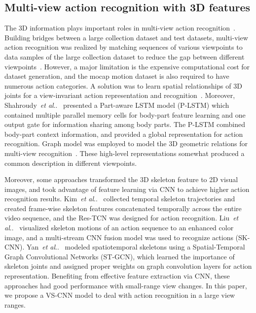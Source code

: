 \documentclass[journal]{IEEEtran}
\makeatletter
\DeclareRobustCommand\onedot{\futurelet\@let@token\@onedot}
\def\@onedot{\ifx\@let@token.\else.\null\fi\xspace}
\def\etal{\emph{et al}\onedot}
\makeatother
\begin{document}
\subsection{Multi-view action recognition with 3D features}
The 3D information plays important roles in multi-view action recognition~\cite{InteractionJi2015,HOI2016}. Building bridges between a large collection dataset and test datasets, multi-view action recognition was realized by matching sequences of various viewpoints to data samples of the large collection dataset to reduce the gap between different viewpoints~\cite{Gupta3Dpose2014,RahmaniNKTM2015,RahmaniNovelV2016}.
However, a major limitation is the expensive computational cost for dataset generation, and the mocap motion dataset is also required to have numerous action categories.
A solution was to learn spatial relationships of 3D joints for a view-invariant action representation and recognition~\cite{ChengACT42012,RahmaniHOPC2014,WangActionlet2013}.
Moreover, Shahroudy~\etal~\cite{ShahroudyNTU2016} presented a Part-aware LSTM model (P-LSTM) which contained multiple parallel memory cells for body-part feature learning and one output gate for information sharing among body parts. The P-LSTM combined body-part context information, and provided a global representation for action recognition. Graph model was employed to model the 3D geometric relations for multi-view recognition~\cite{Wei4DHOI2013,WangMSTAOG2014}.
These high-level representations somewhat produced a common description in different viewpoints.

Moreover, some approaches transformed the 3D skeleton feature to 2D visual images, and took advantage of feature learning via CNN to achieve higher action recognition results. Kim~\etal~\cite{ResTCN2017} collected temporal skeleton trajectories and created frame-wise skeleton features concatenated temporally across the entire video sequence, and the Res-TCN was designed for action recognition. Liu~\etal~\cite{EnhancedSK2017} visualized skeleton motions of an action sequence to an enhanced color image, and a multi-stream CNN fusion model was used to recognize actions (SK-CNN). Yan~\etal~\cite{STGCN2018} modeled spatiotemporal skeletons using a Spatial-Temporal Graph Convolutional Networks (ST-GCN), which learned the importance of skeleton joints and assigned proper weights on graph convolution layers for action representation. Benefiting from effective feature extraction via CNN, these approaches had good performance with small-range view changes. In this paper, we propose a VS-CNN model to deal with action recognition in a large view ranges.
\end{document}
